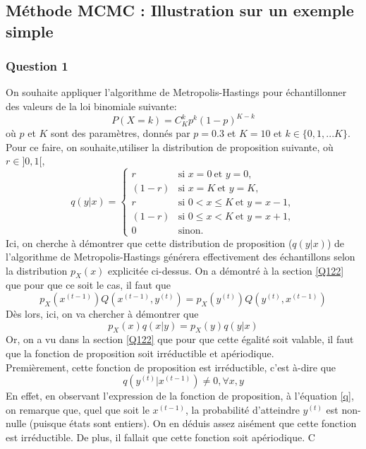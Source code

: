 \documentclass[a4paper, 11pt]{article}
\begin{document}
\subsection{Méthode MCMC : Illustration sur un exemple simple}
\subsubsection{Question 1}
On souhaite appliquer l'algorithme de Metropolis-Hastings pour échantillonner des valeurs de la loi binomiale suivante:
\begin{equation}
    P(X=k)=C_K^k p^k (1-p)^{K-k}
    \label{distrib}
\end{equation}
où $p$ et $K$ sont des paramètres, donnés par $p=0.3$ et $K=10$ et $k\in \{0,1,...K\}$. Pour ce faire, on souhaite,utiliser la distribution de proposition suivante, où $r\in ]0,1[$,
\begin{equation}
    q(y|x) = \left\{
    \begin{array}{ll}
        r & \mbox{si } x=0 ~\mbox{et } y=0,\\
        (1-r) & \mbox{si } x=K~\mbox{et }y=K,\\
        r   & \mbox{si } 0 < x \le K~\mbox{et }y=x-1,\\
        (1-r) & \mbox{si } 0 \le x < K~\mbox{et } y=x+1,\\
        0 & \mbox{sinon.}
    \end{array}
\right.
\label{q}
\end{equation}
Ici, on cherche à démontrer que cette distribution de proposition ($q(y|x)$) de l'algorithme de Metropolis-Hastings générera effectivement des échantillons selon la distribution $p_X(x)$ explicitée ci-dessus. On a démontré à la section \ref{Q122} que pour que ce soit le cas, il faut que
\begin{equation}
    p_X (x^{(t-1)}) Q(x^{(t-1)},y^{(t)})=p_X (y^{(t)}) Q(y^{(t)},x^{(t-1)})
\end{equation}
Dès lors, ici, on va chercher à démontrer que 
\begin{equation}
    p_X(x) q(x|y)=p_X(y) q(y|x)
    \label{22}
\end{equation}
Or, on a vu dans la section \ref{Q122} que pour que cette égalité soit valable, il faut que la fonction de proposition soit irréductible et apériodique.\\
Premièrement, cette fonction de proposition est irréductible, c'est à-dire que $$q(y^{(t)}|x^{(t-1)}) \ne 0, \forall x,y $$
En effet, en observant l'expression de la fonction de proposition, à l'équation \ref{q}, on remarque que, quel que soit le $x^{(t-1)}$, la probabilité d'atteindre $y^{(t)}$ est non-nulle (puisque états sont entiers). On en déduis assez aisément que cette fonction est irréductible. De plus, il fallait que cette fonction soit apériodique. C
\end{document}
